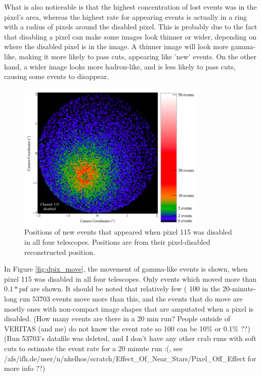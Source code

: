     What is also noticeable is that the highest concentration of lost events was in the pixel's area, whereas the highest rate for appearing events is actually in a ring with a radius of  pixels around the disabled pixel.
    This is probably due to the fact that disabling a pixel can make some images look thinner or wider, depending on where the disabled pixel is in the image.
    A thinner image will look more gamma-like, making it more likely to pass cuts, appearing like 'new' events.
    On the other hand, a wider image looks more hadron-like, and is less likely to pass cuts, causing some events to disappear.

    \begin{figure}[ht]
      \centering
      \includegraphics[width=0.8\textwidth]{images/disabled_pixel/appearing_events}
      \caption[Newly Appearing Events]{
        Positions of new events that appeared when pixel 115 was disabled in all four telescopes.
        Positions are from their pixel-disabled reconstructed position.
      }
      \label{fig:dpix_appear}
    \end{figure}

    In Figure \ref{fig:dpix_move}, the movement of gamma-like events is shown, when pixel 115 was disabled in all four telescopes.
    Only events which moved more than $0.1*\text{psf}$ are shown.
    It should be noted that relatively few ( {\color{red}\nicetilde{}100 in the 20-minute-long run 53703 events} move more than this, and the events that do move are mostly ones with non-compact image shapes that are amputated when a pixel is disabled.
    {\color{red}(How many events are there in a 20 min run? People outside of VERITAS (and me) do not know the event rate so 100 can be 10\% or 0.1\% ??)}
    {\color{red}(Run 53703's datafile was deleted, and I don't have any other crab runs with soft cuts to estimate the event rate for a 20 minute run :(, see /afs/ifh.de/user/n/nkelhos/scratch/Effect\_Of\_Near\_Stars/Pixel\_Off\_Effect for more info ??)}

